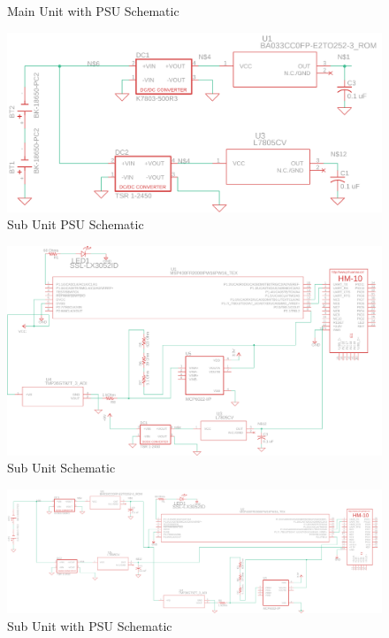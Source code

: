 \documentclass[12pt]{article}
\begin{document}
\begin{landscape}
\begin{center}
\begin{figure}[H]
    \caption{Main Unit with PSU Schematic}
    \label{fig:main-with-psu-schematic}
  \end{figure}
  \end{center}
  \begin{center}
  \begin{figure}[H]
    \includegraphics[width=1.6\textwidth, left]{../Modular Design/Sub-Unit-PSU/Figures/sub-unit-psu.png}
    \caption{Sub Unit PSU Schematic}
    \label{fig:sub-psu-schematic}
  \end{figure}
  \end{center}
  \begin{center}
  \begin{figure}[H]
    \includegraphics[width=1.6\textwidth, left]{../Appendix/Figures/sub-unit.png}
    \caption{Sub Unit Schematic}
    \label{fig:sub-schematic}
  \end{figure}
  \end{center}
  \begin{center}
  \begin{figure}[H]
    \includegraphics[width=\pdfpagewidth,height=0.65\textheight]{../Modular Design/Sub-Unit/Figures/sub-unit-and-psu.png}
    \caption{Sub Unit with PSU Schematic}
    \label{fig:sub-with-psu-schematic}
  \end{figure}
  \end{center}

\end{landscape}
\end{document}
